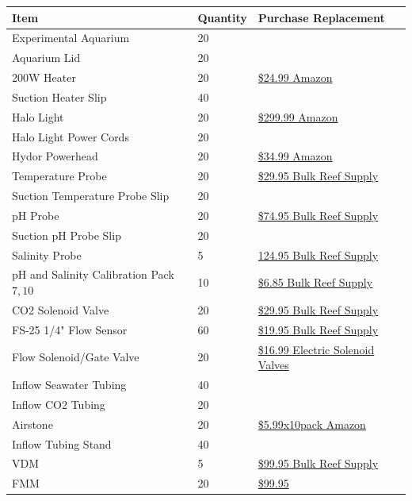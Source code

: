 \documentclass[]{book}
\begin{document}
\begin{longtable}[]{@{}lll@{}}
\toprule
Item & Quantity & Purchase Replacement\tabularnewline
\midrule
\endhead
Experimental Aquarium & 20 &\tabularnewline
Aquarium Lid & 20 &\tabularnewline
200W Heater & 20 &
\href{https://www.amazon.com/Hydor-Submersible-Glass-Aquarium-Heater/dp/B00061UQ7K}{\$24.99
Amazon}\tabularnewline
Suction Heater Slip & 40 &\tabularnewline
Halo Light & 20 &
\href{https://www.amazon.com/Aquatic-Life-Halo-Basic-Fixture/dp/B00T6FGDJW}{\$299.99
Amazon}\tabularnewline
Halo Light Power Cords & 20 &\tabularnewline
Hydor Powerhead & 20 &
\href{https://www.amazon.com/Hydor-Koralia-Nano-Aquarium-Circulation/dp/B0036S70ZG/ref=sr_1_2?keywords=hydor+powerhead\&qid=1572981966\&s=pet-supplies\&sr=1-2}{\$34.99
Amazon}\tabularnewline
Temperature Probe & 20 &
\href{https://www.bulkreefsupply.com/temperature-probe-neptune-systems.html}{\$29.95
Bulk Reef Supply}\tabularnewline
Suction Temperature Probe Slip & 20 &\tabularnewline
pH Probe & 20 &
\href{https://www.bulkreefsupply.com/lab-grade-double-junction-ph-probe-neptune-systems.html}{\$74.95
Bulk Reef Supply}\tabularnewline
Suction pH Probe Slip & 20 &\tabularnewline
Salinity Probe & 5 &
\href{https://www.bulkreefsupply.com/neptune-systems-lab-grade-conductivity-probe.html}{124.95
Bulk Reef Supply}\tabularnewline
pH and Salinity Calibration Pack \(7,10\) & 10 &
\href{https://www.bulkreefsupply.com/probe-calibration-kit-ph-7-0-ph-10-0-salinity-53000us-neptune-systems.html}{\$6.85
Bulk Reef Supply}\tabularnewline
CO2 Solenoid Valve & 20 &
\href{https://www.bulkreefsupply.com/sv-1-solenoid-valve-neptune-systems.html}{\$29.95
Bulk Reef Supply}\tabularnewline
FS-25 1/4" Flow Sensor & 60 &
\href{https://www.bulkreefsupply.com/1-4-flow-sensor-fs25-neptune-systems.html}{\$19.95
Bulk Reef Supply}\tabularnewline
Flow Solenoid/Gate Valve & 20 &
\href{https://www.electricsolenoidvalves.com/1-4-120v-ac-electric-plastic-solenoid-valve/}{\$16.99
Electric Solenoid Valves}\tabularnewline
Inflow Seawater Tubing & 40 &\tabularnewline
Inflow CO2 Tubing & 20 &\tabularnewline
Airstone & 20 &
\href{https://www.amazon.com/Pawfly-Cylinder-Diffuser-Airstones-Hydroponics/dp/B075QCWGZQ/ref=sr_1_5?crid=3EXLLKKDA2NYZ\&keywords=airstones+for+aquariums\&qid=1572983301\&sprefix=airstone\%2Caps\%2C197\&sr=8-5}{\$5.99x10pack
Amazon}\tabularnewline
Inflow Tubing Stand & 40 &\tabularnewline
VDM & 5 &
\href{https://www.bulkreefsupply.com/led-pumps-control-module-vdm-neptune-systems.html}{\$99.95
Bulk Reef Supply}\tabularnewline
FMM & 20 &
\href{https://www.bulkreefsupply.com/fmm-fluid-monitoring-module-neptune-systems.html}{\$99.95
}
\end{longtable}
\end{document}
